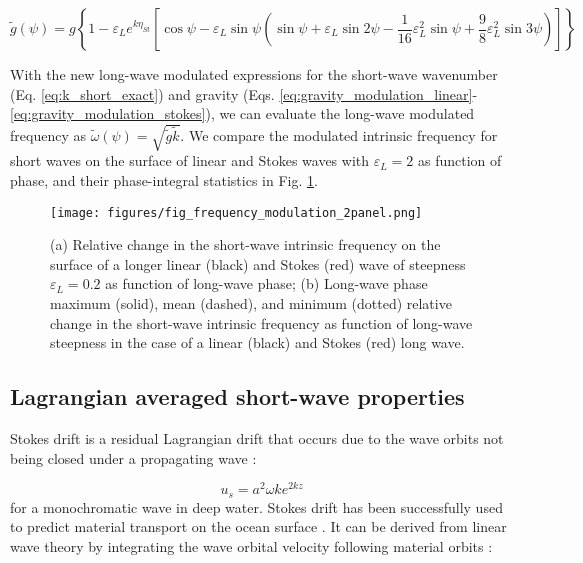 \documentclass[draft]{agujournal2019}
\begin{document}
\begin{equation}
\label{eq:gravity_modulation_stokes}
\widetilde{g}(\psi) =
g \left\{
  1 - \varepsilon_L e^{k \eta_{St}}
  \left[ \cos{\psi} -
    \varepsilon_L \sin{\psi} \left(
      \sin{\psi}
      + \varepsilon_L \sin{2\psi}
      - \dfrac{1}{16} \varepsilon_L^2 \sin{\psi}
      + \dfrac{9}{8} \varepsilon_L^2 \sin{3\psi}
    \right)
  \right]
\right\}
\end{equation}

With the new long-wave modulated expressions for the short-wave wavenumber
(Eq. \ref{eq:k_short_exact}) and gravity
(Eqs. \ref{eq:gravity_modulation_linear}-\ref{eq:gravity_modulation_stokes}),
we can evaluate the long-wave modulated frequency as
$\widetilde{\omega}(\psi) = \sqrt{\widetilde{g} \widetilde{k}}$.
We compare the modulated intrinsic frequency for short waves on the surface of
linear and Stokes waves with $\varepsilon_L=2$ as function of phase, and their
phase-integral statistics in Fig. \ref{fig:frequency_modulation}.

\begin{figure}[h]
\label{fig:frequency_modulation}
\centering
\texttt{[image: figures/fig\_frequency\_modulation\_2panel.png]}
\caption{
  (a) Relative change in the short-wave intrinsic frequency on the surface of a
  longer linear (black) and Stokes (red) wave of steepness $\varepsilon_L = 0.2$
  as function of long-wave phase;
  (b) Long-wave phase maximum (solid), mean (dashed), and minimum (dotted)
  relative change in the short-wave intrinsic frequency as function of long-wave
  steepness in the case of a linear (black) and Stokes (red) long wave.
}
\end{figure}

\subsection{Lagrangian averaged short-wave properties}

Stokes drift is a residual Lagrangian drift that occurs due to the wave orbits
not being closed under a propagating wave
\cite{stokes1847,kenyon1969stokes,van2018stokes}:

\begin{equation}
\label{}
u_s = a^2 \omega k e^{2kz}
\end{equation}
for a monochromatic wave in deep water.
Stokes drift has been successfully used to predict material transport on the
ocean surface \cite{rohrs2012observation,curcic2016hurricane}.
It can be derived from linear wave theory by integrating the wave orbital
velocity following material orbits \cite{phillips1966dynamics}:
\end{document}
